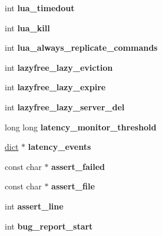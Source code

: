 \begin{DoxyCompactItemize}
int {\bfseries lua\+\_\+timedout}
\item 
\mbox{\label{structredisServer_a31eced748953fd8209d84a5445a9d131}} 
int {\bfseries lua\+\_\+kill}
\item 
\mbox{\label{structredisServer_ace635eab6cd0426c1d806fcbe56bdd35}} 
int {\bfseries lua\+\_\+always\+\_\+replicate\+\_\+commands}
\item 
\mbox{\label{structredisServer_aa88ecf530fb7093b8863521a74f376e9}} 
int {\bfseries lazyfree\+\_\+lazy\+\_\+eviction}
\item 
\mbox{\label{structredisServer_af49c3dd787068f6a0c005a0df590a5a1}} 
int {\bfseries lazyfree\+\_\+lazy\+\_\+expire}
\item 
\mbox{\label{structredisServer_aced67dbd4869735b14f3bf0ce6e7bf0a}} 
int {\bfseries lazyfree\+\_\+lazy\+\_\+server\+\_\+del}
\item 
\mbox{\label{structredisServer_a944799c3b10a71e1332b4ce45ac21828}} 
long long {\bfseries latency\+\_\+monitor\+\_\+threshold}
\item 
\mbox{\label{structredisServer_ab4f390ac17cafbff19dac064a344ba3a}} 
\hyperlink{structdict}{dict} $\ast$ {\bfseries latency\+\_\+events}
\item 
\mbox{\label{structredisServer_a3314abe96399fe2d965a1d93bd334995}} 
const char $\ast$ {\bfseries assert\+\_\+failed}
\item 
\mbox{\label{structredisServer_a25c81f43979fdb93140d605b3405c5ad}} 
const char $\ast$ {\bfseries assert\+\_\+file}
\item 
\mbox{\label{structredisServer_ac3a56910cc37ca8fdfea5a68fa4bf1e8}} 
int {\bfseries assert\+\_\+line}
\item 
\mbox{\label{structredisServer_a111b9872ed4e15355f806ff0811bee64}} 
int {\bfseries bug\+\_\+report\+\_\+start}
\item 

\end{DoxyCompactItemize}
